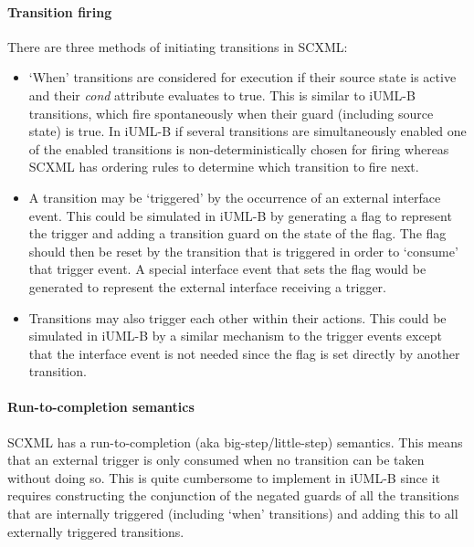 \paragraph{Transition firing}
There are three methods of initiating transitions in SCXML:
\begin{itemize}
\item `When' transitions are considered for execution if their source state is active and their \emph{cond} attribute evaluates to true. 
This is similar to iUML-B transitions, which fire spontaneously when their guard (including source state) is true.
In iUML-B if several transitions are simultaneously enabled one of the enabled transitions is non-deterministically chosen for firing whereas 
SCXML has ordering rules to determine which transition to fire next.
\item A transition may be `triggered' by the occurrence of an external interface event. 
This could be simulated in iUML-B by generating a flag to represent the trigger and adding a transition guard on the state of the flag. 
The flag should then be reset by the transition that is triggered in order to `consume' that trigger event.
 A special interface event that sets the flag would be generated to represent the external interface receiving a trigger.
\item Transitions may also trigger each other within their actions. 
This could be simulated in iUML-B by a similar mechanism to the trigger events except that the interface event is not needed since the flag is set directly by another transition.
\vspace{-0.25cm}
\end{itemize}

\paragraph{Run-to-completion semantics} 
SCXML has a run-to-completion (aka big-step/little-step) semantics.
 This means that an external trigger is only consumed when no transition can be taken without doing so. 
This is quite cumbersome to implement in iUML-B since it requires constructing the conjunction of the negated guards of all the transitions that are internally triggered (including `when' transitions) and adding this to all externally triggered transitions.
\vspace{-0.25cm}

